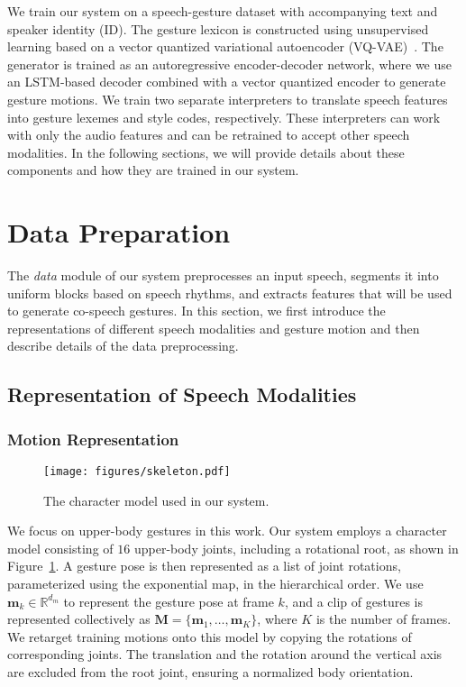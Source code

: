 \documentclass[acmtog,authorversion]{acmart}
\newcommand{\vect}[1]{\bm{#1}}
\newcommand{\fig}{Figure{}~}
\begin{document}
We train our system on a speech-gesture dataset with accompanying text and speaker identity (ID). The gesture lexicon is constructed using unsupervised learning based on a vector quantized variational autoencoder (VQ-VAE)~\cite{oord2017neural}. The generator is trained as an autoregressive encoder-decoder network, where we use an LSTM-based decoder combined with a vector quantized encoder to generate gesture motions. We train two separate interpreters to translate speech features into gesture lexemes and style codes, respectively. These interpreters can work with only the audio features and can be retrained to accept other speech modalities. In the following sections, we will provide details about these components and how they are trained in our system.
 \section{Data Preparation}
\label{sec:data_preparation}
The \emph{data} module of our system preprocesses an input speech, segments it into uniform blocks based on speech rhythms, and extracts features that will be used to generate co-speech gestures. In this section, we first introduce the representations of different speech modalities and gesture motion and then describe details of the data preprocessing.

\subsection{Representation of Speech Modalities}

\subsubsection{Motion Representation}
\begin{figure}[t]
    \centering
    \texttt{[image: figures/skeleton.pdf]}
    \caption{The character model used in our system.}
    \Description{}
    \label{fig:character_model}
\end{figure}
We focus on upper-body gestures in this work. Our system employs a character model consisting of $16$ upper-body joints, including a rotational root, as shown in \fig\ref{fig:character_model}. A gesture pose is then represented as a list of joint rotations, parameterized using the exponential map, in the hierarchical order. We use $\vect{m}_k\in\mathbb{R}^{d_m}$ to represent the gesture pose at frame $k$, and a clip of gestures is  represented collectively as $\vect{M}=\{\vect{m}_1,\dots,\vect{m}_K\}$, where $K$ is the number of frames. We retarget training motions onto this model by copying the rotations of corresponding joints. The translation and the rotation around the vertical axis are excluded from the root joint, ensuring a normalized body orientation.
\end{document}
